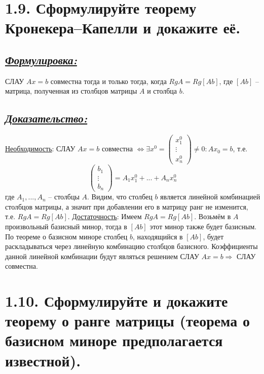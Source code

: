 \documentclass{article}
\begin{document}
\section*{\LARGE 1.9. Сформулируйте теорему Кронекера–Капелли и докажите её. }
\subsection*{\Large \underline{\textit{Формулировка: }}}
СЛАУ $Ax = b$ совместна тогда и только тогда, когда $RgA = Rg[Ab]$, где $[Ab]$ -- матрица, полученная из столбцов матрицы $A$ и столбца $b$. 

\subsection*{\Large \underline{\textit{Доказательство: }}}
\underline{Необходимость}:
\newline СЛАУ $Ax = b$ совместна $\Leftrightarrow \exists x^0 = \begin{pmatrix} x_1^0 \\ \vdots \\ x_n^0 \end{pmatrix} \ne 0 : Ax_0 = b$, т.е. 
$$
\begin{pmatrix} b_1 \\ \vdots \\ b_n \end{pmatrix} = 
A_1x_1^0 + ... + A_nx_n^0 $$
где $A_1, ..., A_n$ -- столбцы $A$.
Видим, что столбец $b$ является линейной комбинацией столбцов матрицы, а значит при добавлении его в матрицу ранг не изменится, т.е. $RgA = Rg[Ab]$.
\newline \underline{Достаточность}:
Имеем $RgA = Rg[Ab]$. Возьмём в $A$ произвольный базисный минор, тогда в $[Ab]$ этот минор также будет базисным. По теореме о базисном миноре столбец $b$, находящийся в $[Ab]$, будет раскладываться через линейную комбинацию столбцов базисного. Коэффициенты данной линейной комбинации будут являться решением СЛАУ $Ax = b \Rightarrow $ СЛАУ совместна.

\section*{\LARGE 1.10. Сформулируйте и докажите теорему о ранге матрицы (теорема о базисном миноре предполагается известной).}
\end{document}
